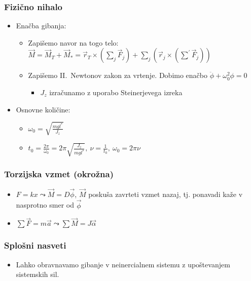 \subsubsection*{Fizično nihalo}
\begin{itemize}
    \item Enačba gibanja:
    \begin{itemize}
        \item Zapišemo navor na togo telo: \(\vec{M} = \vec{M}_T + \vec{M}_* = \vec{r}_T \times (\sum_j \vec{F}_j) + \sum_{j} (\vec{r}_j \times (\sum^{'} \vec{F}_j))\)
        \item Zapišemo II.\ Newtonov zakon za vrtenje. Dobimo enačbo \(\ddot{\phi} + \omega_0^2 \phi = 0\)
        \begin{itemize}
            \item \(J_z\) izračunamo z uporabo Steinerjevega izreka
        \end{itemize}
    \end{itemize}
    \item Osnovne količine:
    \begin{itemize}
        \item \(\omega_0 = \sqrt{\frac{mgl^*}{J_z}}\)
        \item \(t_0 = \frac{2 \pi}{\omega_0} = 2 \pi \sqrt{\frac{J_z}{mgl^*}}, \ \nu = \frac{1}{t_0}, \ \omega_0 = 2 \pi \nu\)
    \end{itemize}
\end{itemize}

\subsubsection*{Torzijska vzmet (okrožna)}
\begin{itemize}
    \item \(F = kx \leadsto \vec{M} = D \vec{\phi}\), \(\vec{M}\) poskuša zavrteti vzmet nazaj, tj. ponavadi kaže v nasprotno smer od \(\vec{\phi}\)
    \item \(\sum \vec{F} = m \vec{a} \leadsto \sum \vec{M} = J \vec{\alpha}\)
\end{itemize}

\subsubsection*{Splošni nasveti}
\begin{itemize}
    \item Lahko obravnavamo gibanje v neinercialnem sistemu z upoštevanjem sistemskih sil.
\end{itemize}

